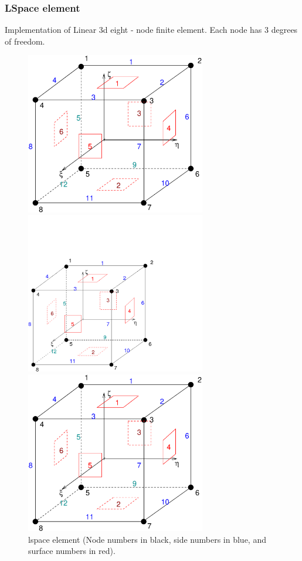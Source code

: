 \documentclass[a4paper]{article}
\begin{document}
\subsubsection{LSpace element}
\label{lspacesect}
Implementation of Linear 3d  eight - node 
finite element. Each node has 3 degrees of freedom.
\begin{figure}[tb]
\begin{htmlonly}
  \centerline{\includegraphics[width=0.7\textwidth]{hexa_lin.eps}}
\end{htmlonly}
\ifpdf
 \centerline{\includegraphics[width=0.7\textwidth]{hexa_lin.pdf}}
\else
 \centerline{\includegraphics[width=0.7\textwidth]{hexa_lin.eps}}
\fi
\caption{lspace element (Node numbers in black, side numbers in blue,
and surface numbers in red).}
\end{figure}
\end{document}
